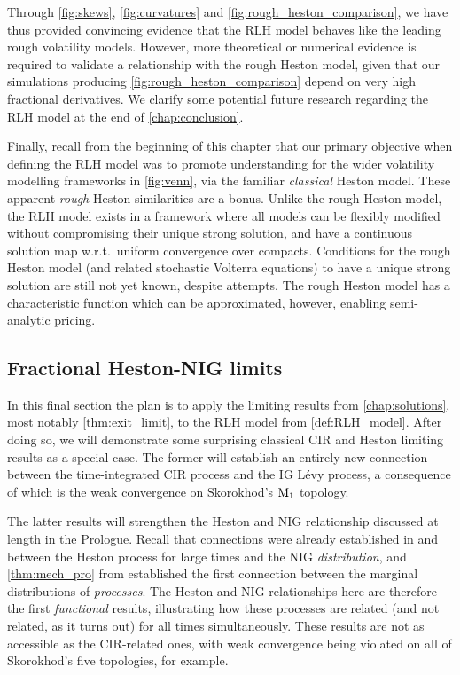 \vspace{2mm}

Through \autoref{fig:skews}, \autoref{fig:curvatures} and \autoref{fig:rough_heston_comparison}, we have thus provided convincing evidence that the RLH model behaves like the leading rough volatility models. However, more theoretical or numerical evidence is required to validate a relationship with the rough Heston model, given that our simulations producing \autoref{fig:rough_heston_comparison} depend on very high fractional derivatives. We clarify some potential future research regarding the RLH model at the end of \autoref{chap:conclusion}.

Finally, recall from the beginning of this chapter that our primary objective when defining the RLH model was to promote understanding for the wider volatility modelling frameworks in \autoref{fig:venn}, via the familiar \emph{classical} Heston model. These apparent \emph{rough} Heston similarities are a bonus. Unlike the rough Heston model, the RLH model exists in a framework where all models can be flexibly modified without compromising their unique strong solution, and have a continuous solution map w.r.t.~uniform convergence over compacts. Conditions for the rough Heston model (and related stochastic Volterra equations) to have a unique strong solution are still not yet known, despite attempts. The rough Heston model has a characteristic function which can be approximated, however, enabling semi-analytic pricing.

\subsection{Fractional Heston-NIG limits}\label{sec:price_limits}

In this final section the plan is to apply the limiting results from \autoref{chap:solutions}, most notably \autoref{thm:exit_limit}, to the RLH model from \autoref{def:RLH_model}. After doing so, we will demonstrate some surprising classical CIR and Heston limiting results as a special case. The former will establish an entirely new connection between the time-integrated CIR process and the IG L\'evy process, a consequence of which is the weak convergence on Skorokhod's $\mathrm{M}_1$ topology.

The latter results will strengthen the Heston and NIG relationship discussed at length in the \hyperlink{prologue}{Prologue}. Recall that connections were already established in \cite{keller-ressel_2011} and \cite{forde_2011} between the Heston process for large times and the NIG \emph{distribution}, and \autoref{thm:mech_pro} from \cite{mechkov_2015} established the first connection between the marginal distributions of \emph{processes}. The Heston and NIG relationships here are therefore the first \emph{functional} results, illustrating how these processes are related (and not related, as it turns out) for all times simultaneously. These results are not as accessible as the CIR-related ones, with weak convergence being violated on all of Skorokhod's five topologies, for example.

